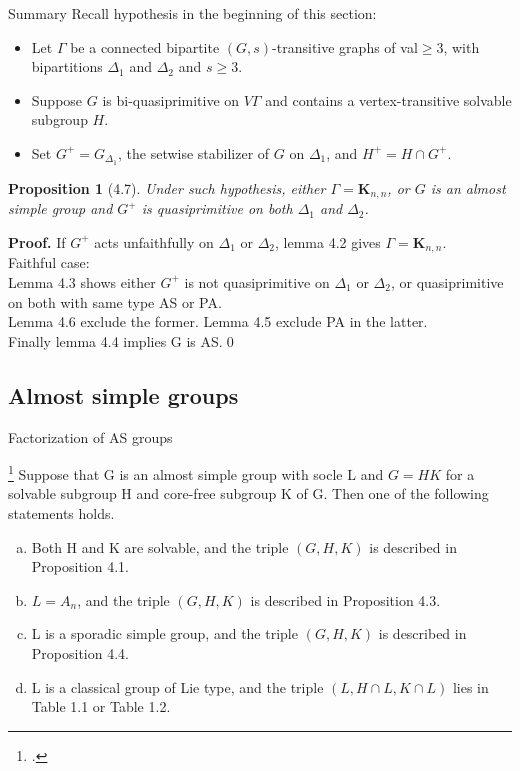 \documentclass{beamer}
\def\proof#1{\textbf{Proof.}{#1}\qed}
\newtheorem{proposition}{Proposition}[theorem]
\begin{document}
\begin{frame}{Summary}
Recall hypothesis in the beginning of this section:
\begin{itemize}
	\item Let $\Gamma$ be a connected bipartite $(G,s)$-transitive graphs of val$\geq 3$, with bipartitions $\Delta_1$ and $\Delta_2$ and $s\geq 3$.
	\item Suppose $G$ is bi-quasiprimitive on $V\Gamma$ and contains a vertex-transitive solvable subgroup $H$. 
	\item Set $G^+=G_{\Delta_1}$, the setwise stabilizer of $G$ on $\Delta_1$, and $H^+=H\cap G^+$.
\end{itemize}

\begin{proposition}[4.7]
Under such hypothesis, either $\Gamma=\mathbf{K}_{n,n}$, or $G$ is an almost simple group and $G^+$ is quasiprimitive on both $\Delta_1$ and $\Delta_2$.
\end{proposition}
\proof{ If $G^+$ acts unfaithfully on $\Delta_1$ or $\Delta_2$, lemma 4.2 gives $\Gamma=\mathbf{K}_{n,n}$.\\
Faithful case: \\Lemma 4.3 shows either $G^+$ is not quasiprimitive on $\Delta_1$ or $\Delta_2$, or quasiprimitive on both with same type AS or PA.\\Lemma 4.6 exclude the former. Lemma 4.5 exclude PA in the latter.\\Finally lemma 4.4 implies G is AS.}
\end{frame}

\subsection{Almost simple groups}

\begin{frame}{Factorization of AS groups}
\begin{Theorem}\footcite{LI2022factorizations}
Suppose that G is an almost simple group with socle L and $G = HK$ for a solvable subgroup H and core-free subgroup K of G. Then one of the following statements holds.
\begin{enumerate}[(a)]
	\item Both H and K are solvable, and the triple $(G, H, K)$ is described in Proposition 4.1.
	\item $L = A_n$, and the triple $(G, H, K)$ is described in Proposition 4.3.
	\item L is a sporadic simple group, and the triple $(G,H,K)$ is described in Proposition 4.4.
	\item L is a classical group of Lie type, and the triple $(L,H\cap L,K\cap L)$ lies in Table 1.1 or Table 1.2.
\end{enumerate}
\end{Theorem}
\end{frame}
\end{document}
